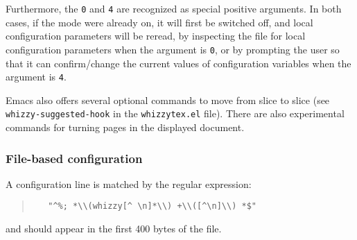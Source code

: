 \documentclass{article}
\let \lst \verb
\begin{document}
Furthermore, the \lst"0" and \lst"4" are recognized as special positive
arguments. In both cases, if the mode were already on, it will first be
switched off, and local configuration parameters will be reread, by
inspecting the file for local configuration parameters when the argument is
\lst"0", or by prompting the user so that it can confirm/change the current
values of configuration variables when the argument is \lst"4".

Emacs also offers several optional commands to move from slice to slice
(see \lst"whizzy-suggested-hook" in the \lst"whizzytex.el" file). 
There are also experimental commands for turning pages in the displayed
document. 


\subsubsection {File-based configuration}

A configuration line is matched by the regular expression:
\begin{quote}
\begin{verbatim}
   "^%; *\\(whizzy[^ \n]*\\) +\\([^\n]\\) *$"
\end{verbatim}%
\end{quote}
and should appear in the first 400 bytes of the file. 
\end{document}
